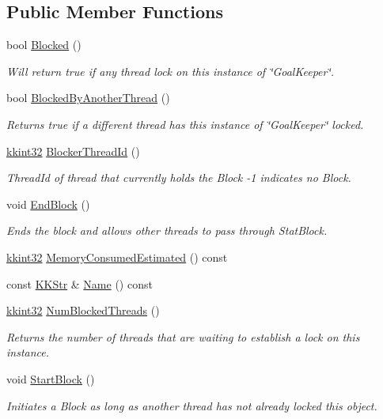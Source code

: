 \subsection*{Public Member Functions}
\begin{DoxyCompactItemize}
\item 
bool \hyperlink{class_k_k_b_1_1_goal_keeper_a8ee2cc75ff5c554ea0a7539bf7320d04}{Blocked} ()
\begin{DoxyCompactList}\small\item\em Will return true if any thread lock on this instance of \char`\"{}\+Goal\+Keeper\char`\"{}. \end{DoxyCompactList}\item 
bool \hyperlink{class_k_k_b_1_1_goal_keeper_a7a5b25e61ce3bea2d7b0dec906f21fc8}{Blocked\+By\+Another\+Thread} ()
\begin{DoxyCompactList}\small\item\em Returns true if a different thread has this instance of \char`\"{}\+Goal\+Keeper\char`\"{} locked. \end{DoxyCompactList}\item 
\hyperlink{namespace_k_k_b_a8fa4952cc84fda1de4bec1fbdd8d5b1b}{kkint32} \hyperlink{class_k_k_b_1_1_goal_keeper_a3337ef9e140587a0958616654d99f554}{Blocker\+Thread\+Id} ()
\begin{DoxyCompactList}\small\item\em Thread\+Id of thread that currently holds the Block -\/1 indicates no Block. \end{DoxyCompactList}\item 
void \hyperlink{class_k_k_b_1_1_goal_keeper_aee88d11d3466dd77ef3e5b18c87e27fb}{End\+Block} ()
\begin{DoxyCompactList}\small\item\em Ends the block and allows other threads to pass through Stat\+Block. \end{DoxyCompactList}\item 
\hyperlink{namespace_k_k_b_a8fa4952cc84fda1de4bec1fbdd8d5b1b}{kkint32} \hyperlink{class_k_k_b_1_1_goal_keeper_a18cb2b73ae95e26d5c50758f440bb259}{Memory\+Consumed\+Estimated} () const 
\item 
const \hyperlink{class_k_k_b_1_1_k_k_str}{K\+K\+Str} \& \hyperlink{class_k_k_b_1_1_goal_keeper_a5ba617538f55a84fd23e5af404e2fbce}{Name} () const 
\item 
\hyperlink{namespace_k_k_b_a8fa4952cc84fda1de4bec1fbdd8d5b1b}{kkint32} \hyperlink{class_k_k_b_1_1_goal_keeper_a1d28630998cac7f65563ae522cf28dfc}{Num\+Blocked\+Threads} ()
\begin{DoxyCompactList}\small\item\em Returns the number of threads that are waiting to establish a lock on this instance. \end{DoxyCompactList}\item 
void \hyperlink{class_k_k_b_1_1_goal_keeper_a2a9565f88cee7b4339c24ed4d5155419}{Start\+Block} ()
\begin{DoxyCompactList}\small\item\em Initiates a Block as long as another thread has not already locked this object. \end{DoxyCompactList}\end{DoxyCompactItemize}
